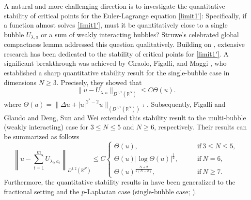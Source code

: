\documentclass[11pt]{article}
\begin{document}
A natural and more challenging direction is to investigate the quantitative stability of critical points for
the Euler-Lagrange equation \eqref{limit1'}: Specifically, if a function almost solves \eqref{limit1'}, must it be quantitatively close to a single bubble \( U_{\lambda,a} \) or a sum of weakly interacting bubbles? Struwe's celebrated global compactness lemma \cite{S84} addressed this question qualitatively. Building on \cite{S84}, extensive research has been dedicated to the stability of critical points for \eqref{limit1'}. A significant breakthrough was achieved by Ciraolo, Figalli, and Maggi \cite{CFM18}, who established a sharp quantitative stability result for the single-bubble case in dimensions \( N \geq 3 \). Precisely, they showed that
\begin{equation*}
  \|u-U_{\lambda,a}\|_{{D}^{1,2}(\mathbb{R}^{N})} \leq  C
 \Theta(u).
\end{equation*}
where $\Theta(u)=\|\Delta u+|u|^{2^*-2}u\|_{({D}^{1,2}(\mathbb{R}^{N}))^{-1}}$.
Subsequently, Figalli and Glaudo \cite{FG20} and Deng, Sun and Wei \cite{DSW25} extended this
stability result to the multi-bubble (weakly interacting) case for $3\leq N \leq5$ and $N\geq6$, respectively. Their results can be summarized as follows
\begin{equation*}
\left\|u-\sum_{i=1}^{m}{U}_{\lambda_i, a_i} \right\|_{{D}^{1,2}(\mathbb{R}^{N})} \leq C
\begin{cases}
 \Theta(u), \qquad & \mathrm{if} ~ 3\leq N\leq 5, \\
  \Theta(u)|\log \Theta(u) |^{\frac{1}{2}}, \qquad & \mathrm{if} ~ N=6, \\
  \Theta(u)^{\frac{N+2}{2(N-2)}}, \qquad & \mathrm{if} ~ N\geq 7.
\end{cases}
\end{equation*}
  Furthermore, the quantitative stability results in \cite{CFM18,DSW25,FG20}
have been generalized to the fractional setting \cite{CKW25} and the $p$-Laplacian case  (single-bubble case; \cite{CG25,LZ25}).
\end{document}
